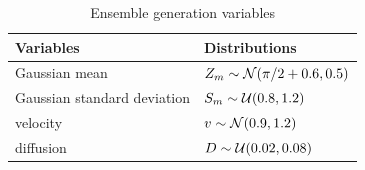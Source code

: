 \begin{table}[htbp]
    \centering
    \caption{Ensemble generation variables}
    \begin{tabular}[t]{|l|l|}
        \hline
        Variables                   & Distributions                              \\
        \hline
        Gaussian mean               & $Z_m \sim  \mathcal{N}(\pi/2 + 0.6, 0.5)$ \\
        Gaussian standard deviation & $S_m \sim\mathcal{U}(0.8, 1.2)$       \\
        velocity                    & $v \sim \mathcal{N}(0.9, 1.2)$        \\
        diffusion                   & $D \sim \mathcal{U}(0.02, 0.08)$          \\
        \hline
    \end{tabular}
    \label{tab:ens_gen_1d}
\end{table}

